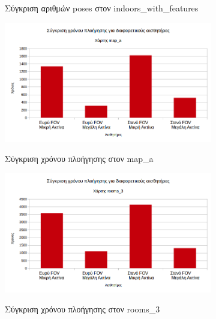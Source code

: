 \begin{figure}[H]
\begin{subfigure}[b]{0.5\textwidth}
         \label{fig:indoors_with_features_poses_compare}
         \caption{Σύγκριση αριθμών poses στον indoors\_with\_features}
     \end{subfigure}%
     \begin{subfigure}[b]{0.5\textwidth}
         \centering
         \includegraphics[width=\textwidth]{./images/chapter6/map_a_time_compare.png}
         \label{fig:map_a_time_compare}
         \caption{Σύγκριση χρόνου πλοήγησης στον map\_a}
     \end{subfigure}
     \begin{subfigure}[b]{0.5\textwidth}
         \centering
         \includegraphics[width=\textwidth]{./images/chapter6/rooms_3_time_compare.png}
         \label{fig:rooms_3_time_compare}
         \caption{Σύγκριση χρόνου πλοήγησης στον rooms\_3}
     \end{subfigure}%
     \begin{subfigure}[b]{0.5\textwidth}
         \centering

\end{subfigure}
\end{figure}
